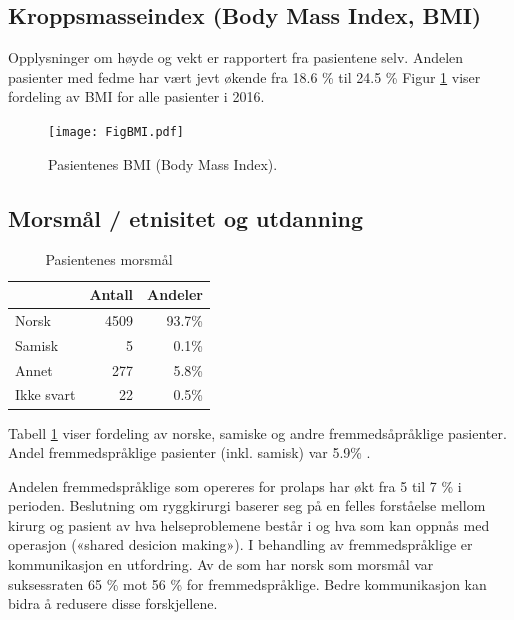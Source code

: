 \documentclass [norsk,a4paper,twoside]{article}\usepackage[]{graphicx}\usepackage[]{color}
\begin{document}

\subsection{Kroppsmasseindex (Body Mass Index, BMI)}



Opplysninger om høyde og vekt er rapportert fra pasientene selv.
Andelen pasienter med fedme har vært jevt økende fra 18.6 \%
til 24.5 \%
Figur \ref{fig:BMI} viser fordeling av BMI for alle pasienter i 2016. 

\begin{figure}[ht]
	\centering \texttt{[image: FigBMI.pdf]}
	\caption{\label{fig:BMI} Pasientenes BMI (Body Mass Index).}
\end{figure}





\subsection{Morsmål / etnisitet og utdanning}

\begin{table}[ht]
\centering
\begin{tabular}{lrr}
  \hline
 & Antall & Andeler \\ 
  \hline
Norsk & 4509 & 93.7\% \\ 
  Samisk & 5 & 0.1\% \\ 
  Annet & 277 & 5.8\% \\ 
  Ikke svart & 22 & 0.5\% \\ 
   \hline
\end{tabular}
\caption{Pasientenes morsmål} 
\label{tab:Morsm}
\end{table}


Tabell \ref{tab:Morsm} viser fordeling av norske, samiske og andre fremmedsåpråklige pasienter.
Andel fremmedspråklige pasienter (inkl. samisk) var 5.9\% . 

Andelen fremmedspråklige som opereres for prolaps har økt fra 5 til 7 \% i perioden.
Beslutning om ryggkirurgi baserer seg på en felles forståelse mellom kirurg og
pasient av hva helseproblemene består i og hva som kan oppnås med operasjon
(«shared desicion making»). I behandling av fremmedspråklige er kommunikasjon
en utfordring. Av de som har norsk som morsmål var suksessraten 65 \% mot 56 \%
for fremmedspråklige. Bedre kommunikasjon kan bidra å redusere disse
forskjellene.
\end{document}

